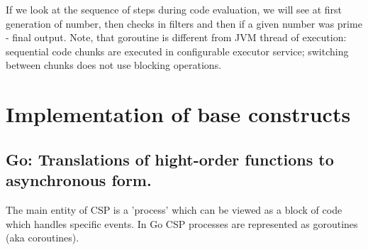 \documentclass[12pt]{article}
\begin{document}
  If we look at the sequence of steps during code evaluation, we will see at first generation of
number, then checks in filters and then if a given number was prime - final output.  Note, that goroutine is different from JVM thread of execution: sequential code chunks are executed in configurable executor service; switching between chunks does not use blocking operations.

\section{Implementation of base constructs }


\subsection{Go: Translations of hight-order functions to asynchronous form.}

 The main entity of CSP is a 'process' which can be viewed as a block of code which handles specific events.  In Go CSP processes are represented as goroutines (aka coroutines). 
\end{document}
